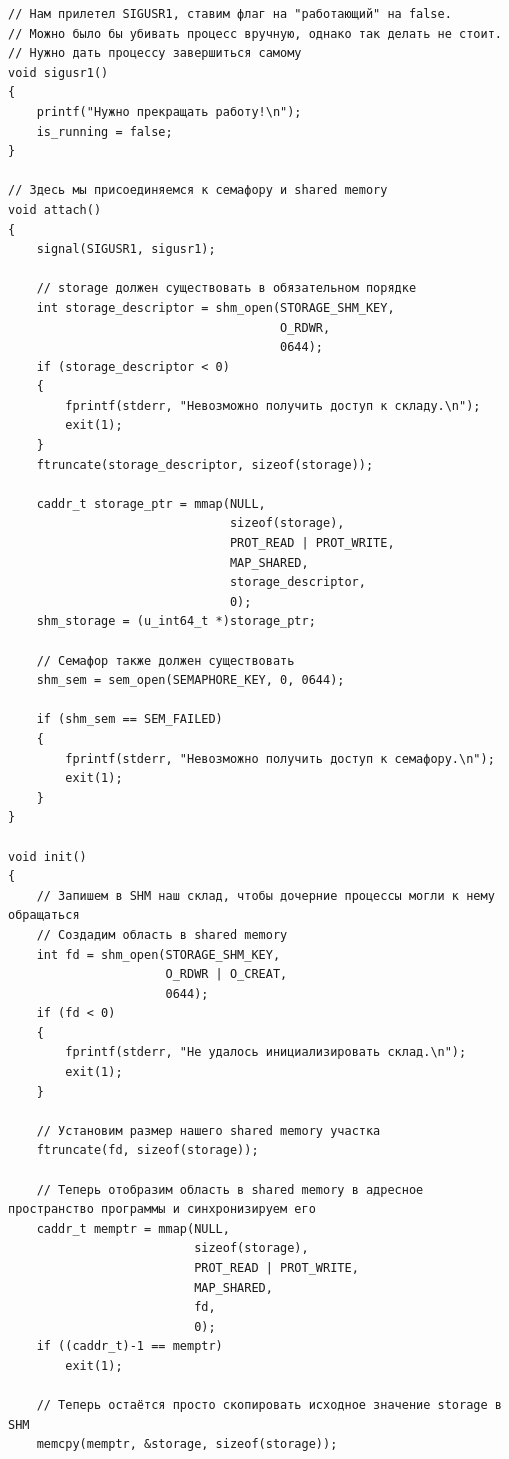 \documentclass[a4paper,14pt]{extarticle}
\begin{document}
\begin{verbatim}
// Нам прилетел SIGUSR1, ставим флаг на "работающий" на false.
// Можно было бы убивать процесс вручную, однако так делать не стоит.
// Нужно дать процессу завершиться самому
void sigusr1()
{
    printf("Нужно прекращать работу!\n");
    is_running = false;
}

// Здесь мы присоединяемся к семафору и shared memory
void attach()
{
    signal(SIGUSR1, sigusr1);

    // storage должен существовать в обязательном порядке
    int storage_descriptor = shm_open(STORAGE_SHM_KEY,
                                      O_RDWR,
                                      0644);
    if (storage_descriptor < 0)
    {
        fprintf(stderr, "Невозможно получить доступ к складу.\n");
        exit(1);
    }
    ftruncate(storage_descriptor, sizeof(storage));

    caddr_t storage_ptr = mmap(NULL,
                               sizeof(storage),
                               PROT_READ | PROT_WRITE,
                               MAP_SHARED,
                               storage_descriptor,
                               0);
    shm_storage = (u_int64_t *)storage_ptr;

    // Семафор также должен существовать
    shm_sem = sem_open(SEMAPHORE_KEY, 0, 0644);

    if (shm_sem == SEM_FAILED)
    {
        fprintf(stderr, "Невозможно получить доступ к семафору.\n");
        exit(1);
    }
}

void init()
{
    // Запишем в SHM наш склад, чтобы дочерние процессы могли к нему обращаться
    // Создадим область в shared memory
    int fd = shm_open(STORAGE_SHM_KEY,
                      O_RDWR | O_CREAT,
                      0644);
    if (fd < 0)
    {
        fprintf(stderr, "Не удалось инициализировать склад.\n");
        exit(1);
    }

    // Установим размер нашего shared memory участка
    ftruncate(fd, sizeof(storage));

    // Теперь отобразим область в shared memory в адресное пространство программы и синхронизируем его
    caddr_t memptr = mmap(NULL,
                          sizeof(storage),
                          PROT_READ | PROT_WRITE,
                          MAP_SHARED,
                          fd,
                          0);
    if ((caddr_t)-1 == memptr)
        exit(1);

    // Теперь остаётся просто скопировать исходное значение storage в SHM
    memcpy(memptr, &storage, sizeof(storage));


\end{verbatim}
\end{document}
